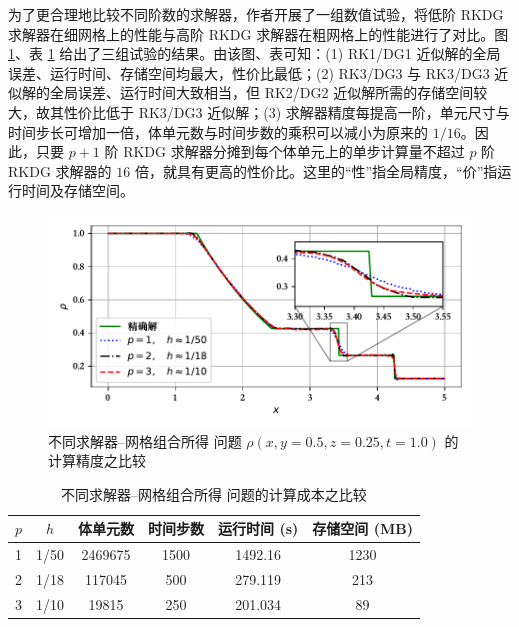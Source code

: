为了更合理地比较不同阶数的求解器，作者开展了一组数值试验，将低阶 RKDG 求解器在细网格上的性能与高阶 RKDG 求解器在粗网格上的性能进行了对比。图
\ref{fig:sod_error}、表 \ref{tab:sod_cost} 给出了三组试验的结果。由该图、表可知：(1)
RK1/DG1 近似解的全局误差、运行时间、存储空间均最大，性价比最低；(2) RK3/DG3 与 RK3/DG3 近似解的全局误差、运行时间大致相当，但
RK2/DG2 近似解所需的存储空间较大，故其性价比低于 RK3/DG3 近似解；(3) 求解器精度每提高一阶，单元尺寸与时间步长可增加一倍，体单元数与时间步数的乘积可以减小为原来的
$1/16$。因此，只要 $p+1$ 阶 RKDG 求解器分摊到每个体单元上的单步计算量不超过 $p$ 阶 RKDG 求解器的
$16$ 倍，就具有更高的性价比。这里的“性”指全局精度，“价”指运行时间及存储空间。

\begin{figure}[h!]
\begin{centering}
\includegraphics[width=1\textwidth,height=0.3\textheight]{figures/shock_tubes/sod/h_vary_tetra}
\par\end{centering}
\caption{\label{fig:sod_error}不同求解器–网格组合所得 问题
$\rho(x,y=0.5,z=0.25,t=1.0)$ 的计算精度之比较}
\end{figure}

\begin{table}
\caption{\label{tab:sod_cost}不同求解器–网格组合所得 问题的计算成本之比较}

\centering{}%
\begin{tabular}{cccccc}
\toprule 
$p$ & $h$ & 体单元数 & 时间步数 & 运行时间 (s) & 存储空间 (MB)\tabularnewline
\midrule 
1 & 1/50 & 2469675 & 1500 & 1492.16 & 1230\tabularnewline
2 & 1/18 & 117045 & 500 & 279.119 & 213\tabularnewline
3 & 1/10 & 19815 & 250 & 201.034 & 89\tabularnewline
\bottomrule
\end{tabular}
\end{table}

